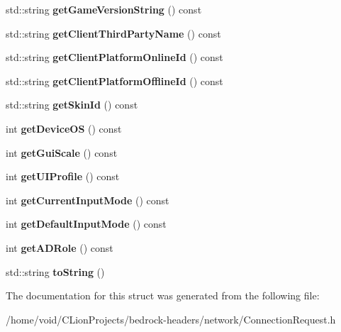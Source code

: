 \begin{DoxyCompactItemize}
\item 
\mbox{\label{struct_connection_request_aaea75c9db3d10252f2e6368b4ba70878}} 
std\+::string {\bfseries get\+Game\+Version\+String} () const
\item 
\mbox{\label{struct_connection_request_ab232f93ae9a2aa2d39d49c28d80f707e}} 
std\+::string {\bfseries get\+Client\+Third\+Party\+Name} () const
\item 
\mbox{\label{struct_connection_request_a71c2f3a2a7a2b943bac8124a7d3b0827}} 
std\+::string {\bfseries get\+Client\+Platform\+Online\+Id} () const
\item 
\mbox{\label{struct_connection_request_aa4dd057c20997892768eb9eb5060cc05}} 
std\+::string {\bfseries get\+Client\+Platform\+Offline\+Id} () const
\item 
\mbox{\label{struct_connection_request_a4fab6a59ca5edda24e5e912645768e8f}} 
std\+::string {\bfseries get\+Skin\+Id} () const
\item 
\mbox{\label{struct_connection_request_a815cf4b29433d8418bfebfa32588891c}} 
int {\bfseries get\+Device\+OS} () const
\item 
\mbox{\label{struct_connection_request_aa36562c36b6674adbcce2c813eacde35}} 
int {\bfseries get\+Gui\+Scale} () const
\item 
\mbox{\label{struct_connection_request_aa33f1ffbf942049e7d29617fdad1e28f}} 
int {\bfseries get\+U\+I\+Profile} () const
\item 
\mbox{\label{struct_connection_request_a2f2d699ce0618362dbe4069bce6bf9f7}} 
int {\bfseries get\+Current\+Input\+Mode} () const
\item 
\mbox{\label{struct_connection_request_a268f2ae63293a573bc0e9cfc683d4d1a}} 
int {\bfseries get\+Default\+Input\+Mode} () const
\item 
\mbox{\label{struct_connection_request_a6957447c7834f7c5bbd73cdc4137d3a4}} 
int {\bfseries get\+A\+D\+Role} () const
\item 
\mbox{\label{struct_connection_request_a89db028246653748c25c11d52af42df0}} 
std\+::string {\bfseries to\+String} ()
\end{DoxyCompactItemize}


The documentation for this struct was generated from the following file\+:\begin{DoxyCompactItemize}
\item 
/home/void/\+C\+Lion\+Projects/bedrock-\/headers/network/Connection\+Request.\+h\end{DoxyCompactItemize}
